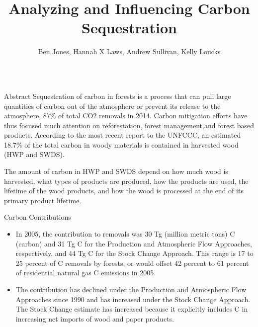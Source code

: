 \documentclass[final]{beamer}\usepackage[]{graphicx}\usepackage[]{color}
\title{Analyzing and Influencing Carbon Sequestration}
\author{Ben Jones, Hannah X Laws, Andrew Sullivan, Kelly Loucks}
\institute{Department of Mathematical Sciences}
\begin{document}
\begin{frame}[fragile]
\vspace{-2ex}
\begin{columns}[t]





\begin{column}{0.23\linewidth}
\begin{minipage}[t][.955\textheight]{\linewidth} 

\vspace{0ex}
\begin{block}{Abstract}
Sequestration of carbon in forests is a process that can pull large quantities of carbon out of the atmosphere or prevent its release to the atmosphere, 87\% of total CO2 removals in 2014. Carbon mitigation efforts have thus focused much attention on reforestation, forest management,and forest based products.  According to the most recent report to the UNFCCC, an estimated 18.7\% of the total carbon in woody materials is contained in harvested wood (HWP and SWDS).  
\vspace{1ex}

The amount of carbon in HWP and SWDS depend on how much wood is harvested, what types of products are produced, how the products are used, the lifetime of the wood products, and how the wood is processed at the end of its primary product lifetime.

\vspace{0ex}
\end{block}
\vfill

\begin{block}{Carbon Contributions}
\begin{itemize}
\item In 2005, the contribution to removals was 30 Tg (million metric tons) C (carbon) and 31 Tg C for the Production and Atmospheric Flow Approaches, respectively, and 44 Tg C for the Stock Change Approach. This range is 17 to 25 percent of C removals by forests, or would offset 42 percent to 61 percent of residential natural gas C emissions in 2005. 
\vspace{1ex}
\item The contribution has declined under the Production and Atmospheric Flow Approaches since 1990 and has increased under the Stock Change Approach. The Stock Change estimate has increased because it explicitly includes C in increasing net imports of wood and paper products. 
\vspace{1ex}
\end{itemize}
\vspace{0ex}
\vfill
\end{block}
\vfill


\end{minipage}
\end{column}
\end{columns}
\end{frame}
\end{document}

